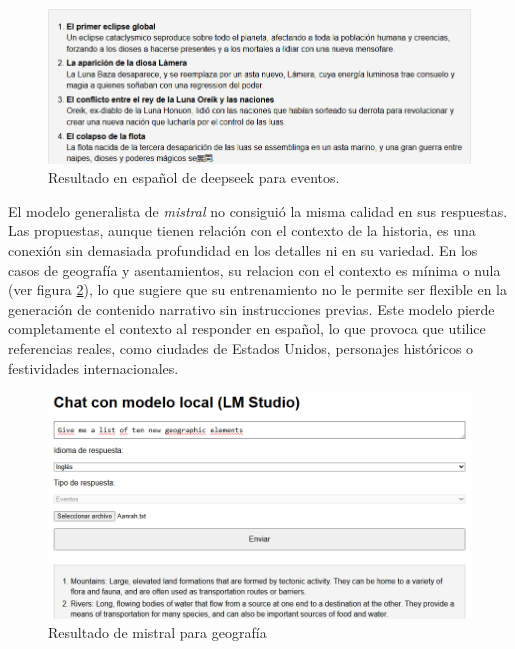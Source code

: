 \begin{figure}[htbp]
	\centering
	\includegraphics[width=1\textwidth]{./Figures/deepseek-noprompt-spanish.png}
	\caption{Resultado en español de deepseek para eventos.}
	\label{fig:deepseek-esp}
\end{figure}
\pagebreak
El modelo generalista de \textit{mistral} no consiguió la misma calidad en sus respuestas.
Las propuestas, aunque tienen relación con el contexto de la historia,
es una conexión sin demasiada profundidad en los detalles ni en su variedad.
En los casos de geografía y asentamientos, su relacion con el contexto es mínima o nula
(ver figura \ref{fig:mistral-geo}), lo que sugiere que su entrenamiento no le permite ser
flexible en la generación de contenido narrativo sin instrucciones previas.
Este modelo pierde completamente el contexto al responder en español,
lo que provoca que utilice referencias reales,
como ciudades de Estados Unidos, personajes históricos o festividades internacionales.

\begin{figure}[htbp]
	\centering
	\includegraphics[width=1\textwidth]{./Figures/mistral-noprompt-geography.png}
	\caption{Resultado de mistral para geografía}
	\label{fig:mistral-geo}
\end{figure}

